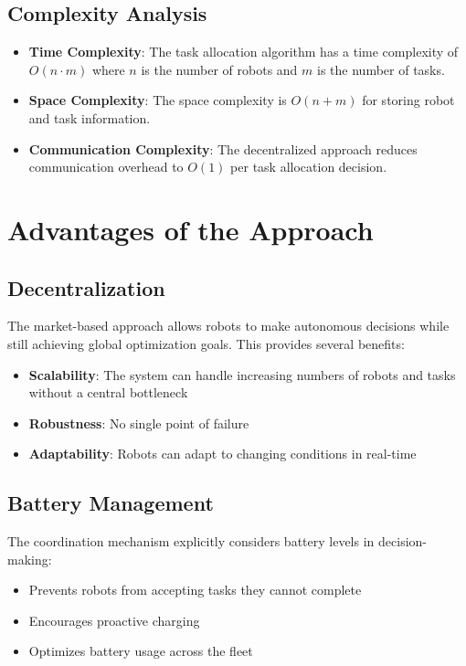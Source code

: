 \documentclass[12pt,a4paper]{article}
\begin{document}
\subsection{Complexity Analysis}

\begin{itemize}
    \item \textbf{Time Complexity}: The task allocation algorithm has a time complexity of $O(n \cdot m)$ where $n$ is the number of robots and $m$ is the number of tasks.
    \item \textbf{Space Complexity}: The space complexity is $O(n + m)$ for storing robot and task information.
    \item \textbf{Communication Complexity}: The decentralized approach reduces communication overhead to $O(1)$ per task allocation decision.
\end{itemize}

\section{Advantages of the Approach}

\subsection{Decentralization}

The market-based approach allows robots to make autonomous decisions while still achieving global optimization goals. This provides several benefits:

\begin{itemize}
    \item \textbf{Scalability}: The system can handle increasing numbers of robots and tasks without a central bottleneck
    \item \textbf{Robustness}: No single point of failure
    \item \textbf{Adaptability}: Robots can adapt to changing conditions in real-time
\end{itemize}

\subsection{Battery Management}

The coordination mechanism explicitly considers battery levels in decision-making:

\begin{itemize}
    \item Prevents robots from accepting tasks they cannot complete
    \item Encourages proactive charging
    \item Optimizes battery usage across the fleet
\end{itemize}
\end{document}
